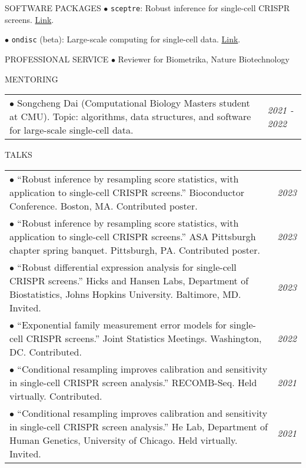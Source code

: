 \documentclass{resume} %
\begin{document}
\begin{rSection}{SOFTWARE PACKAGES}
	$\bullet$ \texttt{sceptre}: Robust inference for single-cell CRISPR screens. \href{https://katsevich-lab.github.io/sceptre/}{Link}.
	
	$\bullet$ \texttt{ondisc} (beta): Large-scale computing for single-cell data. \href{https://github.com/timothy-barry/ondisc}{Link}.
\end{rSection}

\begin{rSection}{PROFESSIONAL SERVICE}
	$\bullet$ Reviewer for Biometrika, Nature Biotechnology
\end{rSection}

\begin{rSection}{MENTORING}
	\begin{tabular}{p{14cm}R{2.5cm}}
		$\bullet$ Songcheng Dai (Computational Biology Masters student at CMU). Topic: algorithms, data structures, and software for large-scale single-cell data.
		& \textit{2021 - 2022} \\ 
	\end{tabular} 
\end{rSection}

\begin{rSection}{TALKS}
	
	\begin{tabular}{p{14cm}R{2.5cm}}
		$\bullet$ ``Robust inference by resampling score statistics, with application to single-cell CRISPR screens.'' Bioconductor Conference. Boston, MA. Contributed poster.&\textit{2023}\\
		
		$\bullet$ ``Robust inference by resampling score statistics, with application to single-cell CRISPR screens.'' ASA Pittsburgh chapter spring
		banquet. Pittsburgh, PA. Contributed poster. & \it{2023} \\
		
		$\bullet$ ``Robust differential expression analysis for single-cell CRISPR screens.'' Hicks and Hansen Labs, Department of Biostatistics, Johns Hopkins University. Baltimore, MD. Invited. & \it{2023} \\
		
		$\bullet$ ``Exponential family measurement error models for single-cell CRISPR screens.'' Joint Statistics Meetings. Washington, DC. Contributed.  & \it{2022} \\
		
		$\bullet$  ``Conditional resampling improves calibration and sensitivity in single-cell CRISPR screen analysis.'' RECOMB-Seq. Held virtually. Contributed. & \it{2021} \\
		
		$\bullet$ ``Conditional resampling improves calibration and sensitivity in single-cell CRISPR screen analysis.'' He Lab, Department of Human Genetics, University of Chicago. Held virtually. Invited. & \it{2021}
	\end{tabular}
	
\end{rSection}
\end{document}
